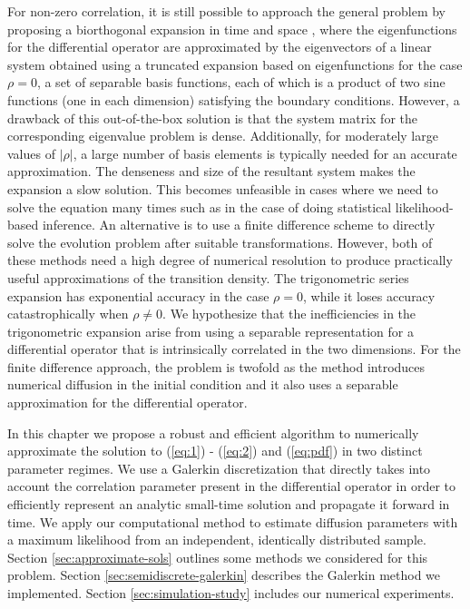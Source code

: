 For non-zero correlation, it is still possible to approach the general
problem by proposing a biorthogonal expansion in time and space
\citep[section 6.2]{risken1989fokker-planck}, where the
eigenfunctions for the differential operator are approximated by the
eigenvectors of a linear system obtained using a truncated expansion
based on eigenfunctions for the case $\rho=0$, a set of separable
basis functions, each of which is a product of two sine functions (one
in each dimension) satisfying the boundary conditions. However, a
drawback of this out-of-the-box solution is that the system matrix for
the corresponding eigenvalue problem is dense. Additionally, for
moderately large values of $|\rho|$, a large number of basis elements
is typically needed for an accurate approximation. The denseness and
size of the resultant system makes the expansion a slow solution. This
becomes unfeasible in cases where we need to solve the equation many
times such as in the case of doing statistical likelihood-based
inference. An alternative is to use a finite difference scheme to
directly solve the evolution problem after suitable
transformations. However, both of these methods need a high degree of
numerical resolution to produce practically useful approximations of
the transition density. The trigonometric series expansion has
exponential accuracy in the case $\rho=0$, while it loses accuracy
catastrophically when $\rho\neq 0$. We hypothesize that the
inefficiencies in the trigonometric expansion arise from using a
separable representation for a differential operator that is
intrinsically correlated in the two dimensions. For the finite
difference approach, the problem is twofold as the method introduces
numerical diffusion in the initial condition and it also uses a
separable approximation for the differential operator.

In this chapter we propose a robust and efficient algorithm to
numerically approximate the solution to (\ref{eq:1}) - (\ref{eq:2})
and (\ref{eq:pdf}) in two distinct parameter regimes. We use a
Galerkin discretization that directly takes into account the
correlation parameter present in the differential operator in order to
efficiently represent an analytic small-time solution and propagate it
forward in time. We apply our computational method to estimate
diffusion parameters with a maximum likelihood from an independent,
identically distributed sample. Section \ref{sec:approximate-sols}
outlines some methods we considered for this problem. Section
\ref{sec:semidiscrete-galerkin} describes the Galerkin method we
implemented. Section \ref{sec:simulation-study} includes our numerical
experiments.


